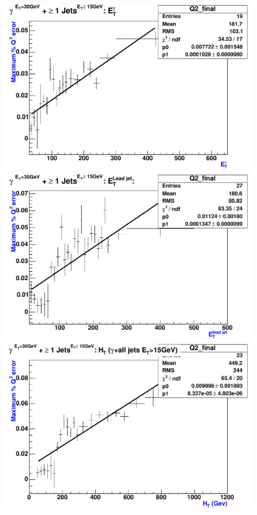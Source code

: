 \begin{figure}[p]
 \centering
 \includegraphics[scale=0.36,keepaspectratio=true]{Q2syst_pj1_Et_pho.pdf}\hspace{2ex}
 \includegraphics[scale=0.36,keepaspectratio=true]{Q2syst_pj1_Et_leadjet.pdf}\\[2ex]
 \includegraphics[scale=0.36,keepaspectratio=true]{Q2syst_pj1_Ht.pdf}\hspace{2ex}

\end{figure}
